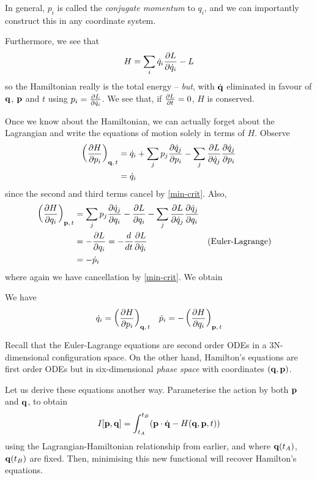 \documentclass{../template/note}
\begin{document}
    In general, $p_i$ is called the \emph{conjugate momentum} to $q_i$, and we can importantly construct this in any coordinate system.

    Furthermore, we see that
    \begin{align*}
        H = \sum_i \dot q_i \pd{L}{\dot q_i} - L
    \end{align*}
    so the Hamiltonian really is the total energy -- \emph{but}, with $\dot{\V q}$ eliminated in favour of $\V q$, $\V p$ and $t$ using $p_i = \pd{L}{\dot q_i}$. We see that, if $\pd{L}{t} = 0$, $H$ is conserved.

    Once we know about the Hamiltonian, we can actually forget about the Lagrangian and write the equations of motion solely in terms of $H$. Observe
    \begin{align*}
        \left(\pd{H}{p_i}\right)_{\V q,\, t} &= \dot q_i + \sum_j p_j \pd{\dot q_j}{p_i} - \sum_j \pd{L}{\dot q_j} \pd{\dot q_j}{p_i} \\
        &= \dot q_i
    \end{align*}
    since the second and third terms cancel by \cref{min-crit}. Also,
    \begin{align*}
        \left(\pd{H}{q_i}\right)_{\V p,\, t} &= \sum_j p_j \pd{\dot q_j}{q_i} - \pd{L}{q_i} - \sum_j \pd{L}{\dot q_j} \pd{\dot q_j}{q_i} \\
        &= -\pd{L}{q_i} = -\frac{d}{dt} \pd{L}{\dot q_i} && \text{(Euler-Lagrange)} \\
        &= -\dot p_i
    \end{align*}
    where again we have cancellation by \cref{min-crit}. We obtain
    \begin{proposition}
        We have
        \begin{align*}
            \dot q_i = \left(\pd{H}{p_i}\right)_{\V q,\, t} && \dot p_i = -\left(\pd{H}{q_i}\right)_{\V p,\, t}
        \end{align*}
    \end{proposition}
    Recall that the Euler-Lagrange equations are second order ODEs in a 3N-dimensional configuration space. On the other hand, Hamilton's equations are first order ODEs but in six-dimensional \emph{phase space} with coordinates $(\V q, \V p)$.

    Let us derive these equations another way. Parameterise the action by both $\V p$ and $\V q$, to obtain
    \begin{align*}
        I[\V p, \V q] = \int_{t_A}^{t_B} (\V p \cdot \dot{\V q} - H(\V q, \V p, t))
    \end{align*}
    using the Lagrangian-Hamiltonian relationship from earlier, and where $\V q(t_A)$, $\V q(t_B)$ are fixed. Then, minimising this new functional will recover Hamilton's equations.
    
\end{document}
